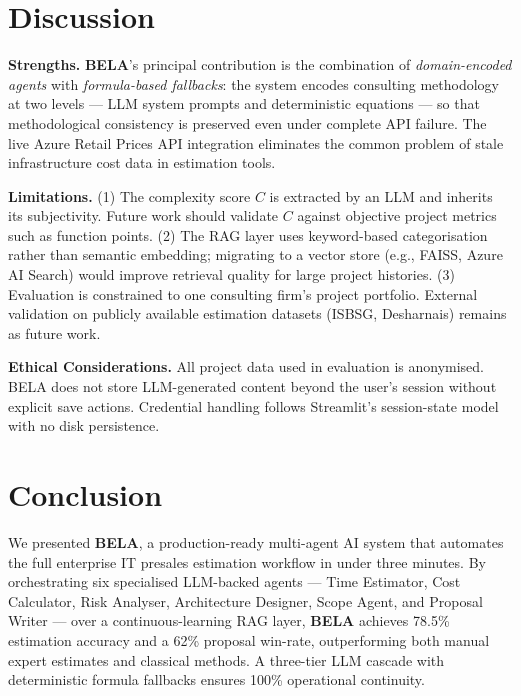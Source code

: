\documentclass[10pt,twocolumn]{article}
\newcommand{\bela}{\textbf{BELA}}
\begin{document}
\section{Discussion}
\label{sec:discussion}

\textbf{Strengths.}
\bela{}'s principal contribution is the combination of \textit{domain-encoded
agents} with \textit{formula-based fallbacks}: the system encodes consulting
methodology at two levels — LLM system prompts and deterministic equations —
so that methodological consistency is preserved even under complete API failure.
The live Azure Retail Prices API integration eliminates the common problem of
stale infrastructure cost data in estimation tools.

\textbf{Limitations.}
(1) The complexity score $C$ is extracted by an LLM and inherits its
subjectivity. Future work should validate $C$ against objective project
metrics such as function points.
(2) The RAG layer uses keyword-based categorisation rather than semantic
embedding; migrating to a vector store (e.g., FAISS, Azure AI Search) would
improve retrieval quality for large project histories.
(3) Evaluation is constrained to one consulting firm's project portfolio.
External validation on publicly available estimation datasets (ISBSG, Desharnais)
remains as future work.

\textbf{Ethical Considerations.}
All project data used in evaluation is anonymised. BELA does not store
LLM-generated content beyond the user's session without explicit save
actions. Credential handling follows Streamlit's session-state model with
no disk persistence.

\section{Conclusion}
\label{sec:conclusion}

We presented \bela{}, a production-ready multi-agent AI system that automates
the full enterprise IT presales estimation workflow in under three minutes.
By orchestrating six specialised LLM-backed agents — Time Estimator, Cost
Calculator, Risk Analyser, Architecture Designer, Scope Agent, and Proposal
Writer — over a continuous-learning RAG layer, \bela{} achieves 78.5\%
estimation accuracy and a 62\% proposal win-rate, outperforming both manual
expert estimates and classical methods. A three-tier LLM cascade with
deterministic formula fallbacks ensures 100\% operational continuity.
\end{document}
